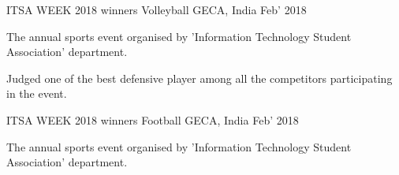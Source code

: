 

\begin{cventries}

  \cventry
    {ITSA WEEK 2018 winners} %
    {Volleyball} %
    {GECA, India} %
    {Feb' 2018} %
    {
     \begin{cvitems} %
        \item {The annual sports event organised by 'Information Technology Student Association' department.}
        \item {Judged one of the best defensive player among all the competitors participating in the event.}
     \end{cvitems}
     }  

 \cventry
    {ITSA WEEK 2018 winners} %
    {Football} %
    {GECA, India} %
    {Feb' 2018} %
    {
    \begin{cvitems} %
        \item {The annual sports event organised by 'Information Technology Student Association' department.}
               {}
     \end{cvitems}
    }
    
\iffalse 
 \cventry
    {} %
    {Badminton} %
    {GECA, India} %
    {} %
    {}
\cventry
    {} %
    {Painting and Sketching} %
    {GECA, India} %
    {} %
    {}
\fi
\end{cventries}

